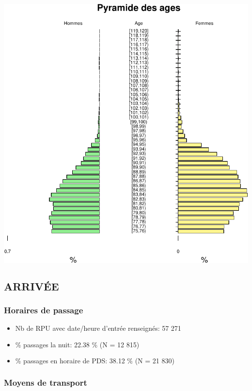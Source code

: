 \documentclass[]{article}
\begin{document}
\includegraphics{rapport2014_V4_files/figure-latex/sous_classe_age-1.pdf}

\subsection{ARRIVÉE}\label{arrivee-1}

\subsubsection{Horaires de passage}\label{horaires-de-passage-1}

\begin{itemize}
\itemsep1pt\parskip0pt
\item
  Nb de RPU avec date/heure d'entrée renseignés: 57 271
\item
  \% passages la nuit: 22.38 \% (N = 12 815)
\item
  \% passages en horaire de PDS: 38.12 \% (N = 21 830)
\end{itemize}

\subsubsection{Moyens de transport}\label{moyens-de-transport}
\end{document}
